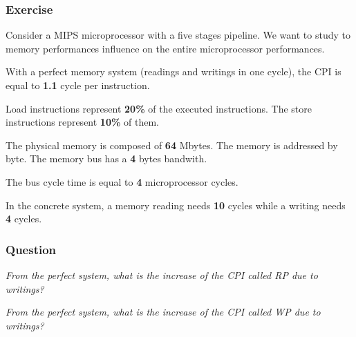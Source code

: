 
\begin{frame}
  \frametitle{Exercise}

  Consider a MIPS microprocessor with a five stages pipeline. We want to
  study to memory performances influence on the entire microprocessor
  performances.

  \-

  With a perfect memory system (readings and writings in one cycle),
  the CPI is equal to \textbf{1.1} cycle per instruction.

  \-

  Load instructions represent \textbf{20\%} of the executed instructions.
  The store instructions represent \textbf{10\%} of them.

  \-

  The physical memory is composed of \textbf{64} Mbytes. The memory
  is addressed by byte. The memory bus has a \textbf{4} bytes bandwith.

  \-

  The bus cycle time is equal to \textbf{4} microprocessor cycles.

  \-

  In the concrete system, a memory reading needs \textbf{10} cycles while
  a writing needs \textbf{4} cycles.
\end{frame}


\begin{frame}
  \frametitle{Question}

  \textit{From the perfect system, what is the increase of the
    CPI called RP due to writings?}

  \-

  \textit{From the perfect system, what is the increase of the
    CPI called WP due to writings?}
\end{frame}


